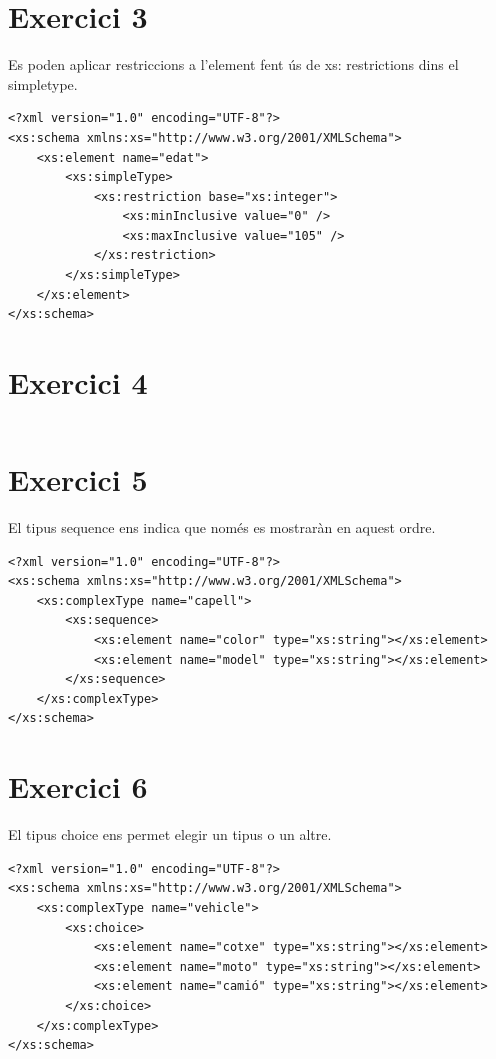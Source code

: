 \documentclass{article}
\begin{document}
\newpage

\section{Exercici 3}
Es poden aplicar restriccions a l'element fent ús de xs: restrictions dins el simpletype.

\begin{verbatim}
<?xml version="1.0" encoding="UTF-8"?>
<xs:schema xmlns:xs="http://www.w3.org/2001/XMLSchema">
    <xs:element name="edat">
        <xs:simpleType>
            <xs:restriction base="xs:integer">
                <xs:minInclusive value="0" />
                <xs:maxInclusive value="105" />
            </xs:restriction>
        </xs:simpleType>
    </xs:element>
</xs:schema>
\end{verbatim}
\vspace{,5cm}

\section{Exercici 4}

\begin{verbatim}

\end{verbatim}
\vspace{0cm}

\section{Exercici 5}
El tipus sequence ens indica que només es mostraràn en aquest ordre.
\begin{verbatim}
<?xml version="1.0" encoding="UTF-8"?>
<xs:schema xmlns:xs="http://www.w3.org/2001/XMLSchema">
    <xs:complexType name="capell">
        <xs:sequence>
            <xs:element name="color" type="xs:string"></xs:element>
            <xs:element name="model" type="xs:string"></xs:element>
        </xs:sequence>
    </xs:complexType>
</xs:schema>
\end{verbatim}
\vspace{0cm}
\newpage
\section{Exercici 6}
El tipus choice ens permet elegir un tipus o un altre.
\begin{verbatim}
<?xml version="1.0" encoding="UTF-8"?>
<xs:schema xmlns:xs="http://www.w3.org/2001/XMLSchema">
    <xs:complexType name="vehicle">
        <xs:choice>
            <xs:element name="cotxe" type="xs:string"></xs:element>
            <xs:element name="moto" type="xs:string"></xs:element>
            <xs:element name="camió" type="xs:string"></xs:element>
        </xs:choice>
    </xs:complexType>
</xs:schema>
\end{verbatim}
\vspace{0cm}
\end{document}
